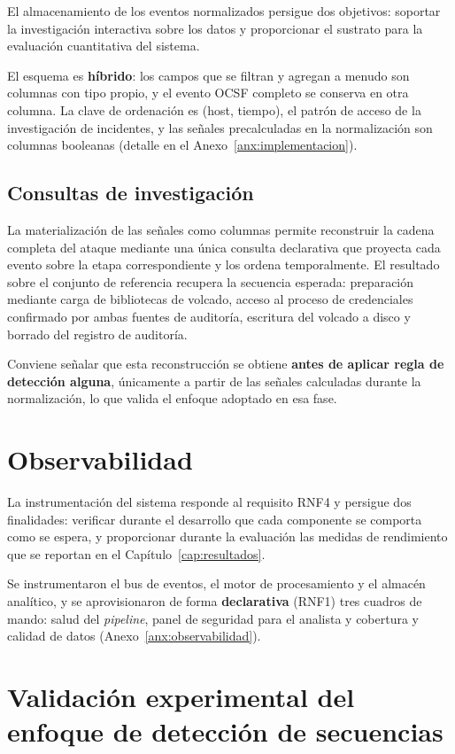 El almacenamiento de los eventos normalizados persigue dos objetivos: soportar la
investigación interactiva sobre los datos y proporcionar el sustrato para la evaluación
cuantitativa del sistema.

El esquema es \textbf{híbrido}: los campos que se filtran y agregan a menudo son columnas con
tipo propio, y el evento OCSF completo se conserva en otra columna. La clave de ordenación es
(host, tiempo), el patrón de acceso de la investigación de incidentes, y las señales
precalculadas en la normalización son columnas booleanas (detalle en el
Anexo~\ref{anx:implementacion}).

\subsection{Consultas de investigación}

La materialización de las señales como columnas permite reconstruir la cadena completa del
ataque mediante una única consulta declarativa que proyecta cada evento sobre la etapa
correspondiente y los ordena temporalmente. El resultado sobre el conjunto de referencia
recupera la secuencia esperada: preparación mediante carga de bibliotecas de volcado, acceso
al proceso de credenciales confirmado por ambas fuentes de auditoría, escritura del volcado a
disco y borrado del registro de auditoría.

Conviene señalar que esta reconstrucción se obtiene \textbf{antes de aplicar regla de
detección alguna}, únicamente a partir de las señales calculadas durante la normalización, lo
que valida el enfoque adoptado en esa fase.

\section{Observabilidad}

La instrumentación del sistema responde al requisito RNF4 y persigue dos finalidades:
verificar durante el desarrollo que cada componente se comporta como se espera, y
proporcionar durante la evaluación las medidas de rendimiento que se reportan en el
Capítulo~\ref{cap:resultados}.

Se instrumentaron el bus de eventos, el motor de procesamiento y el almacén analítico, y se
aprovisionaron de forma \textbf{declarativa} (RNF1) tres cuadros de mando: salud del
\textit{pipeline}, panel de seguridad para el analista y cobertura y calidad de datos
(Anexo~\ref{anx:observabilidad}).

\section{Validación experimental del enfoque de detección de secuencias}
\label{sec:validacion_cep}

